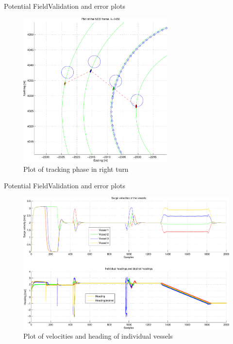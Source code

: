 \documentclass[10pt,handout]{beamer}
\begin{document}
\begin{frame}{Potential Field}{Validation and error plots}
  \begin{figure}
    \includegraphics[width=0.7\textwidth]{img/pdfsvingstykke}
    \caption{Plot of tracking phase in right turn}
  \end{figure}
\end{frame}

\begin{frame}{Potential Field}{Validation and error plots}
  \begin{figure}
    \includegraphics[width=\textwidth]{img/pdfveloghead}
    \caption{Plot of velocities and heading of individual vessels}
  \end{figure}
\end{frame}
\end{document}
